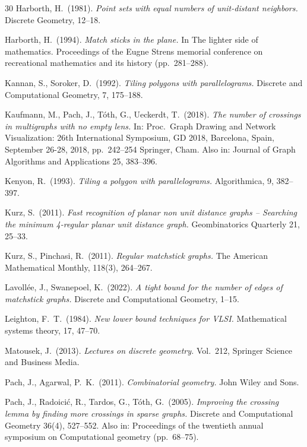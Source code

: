 \documentclass[a4paper,10pt]{article}
\begin{document}
\begin{thebibliography}{30}
Harborth, H.\ (1981).
{\it Point sets with equal numbers of unit-distant neighbors.}
Discrete Geometry, 12--18.

Harborth, H.\ (1994).
{\it Match sticks in the plane.}
In The lighter side of mathematics. Proceedings of the Eugne Strens memorial conference on recreational mathematics and its history (pp.\ 281--288).


Kannan, S., Soroker, D.\ (1992).
\emph{Tiling polygons with parallelograms.}
Discrete and Computational Geometry, 7, 175--188.


Kaufmann, M., Pach, J., T\'oth, G., Ueckerdt, T.\ (2018).
{\it The number of crossings in multigraphs with no empty lens.}
In: Proc.\ Graph Drawing and Network Visualization: 26th International Symposium, GD 2018, Barcelona, Spain, September 26-28, 2018, pp.\ 242--254 Springer, Cham. Also in: Journal of Graph Algorithms and Applications 25, 383--396. 



Kenyon, R.\ (1993).
\emph{Tiling a polygon with parallelograms.}
Algorithmica, 9, 382--397.



Kurz, S.\ (2011).
{\it Fast recognition of planar non unit distance graphs -- Searching the minimum 4-regular planar unit distance graph.}
Geombinatorics Quarterly 21, 25--33.

Kurz, S., Pinchasi, R.\ (2011).
{\it Regular matchstick graphs.}
The American Mathematical Monthly, 118(3), 264--267.

Lavoll\'ee, J., Swanepoel, K.\ (2022).
{\it A tight bound for the number of edges of matchstick graphs.}
Discrete and Computational Geometry, 1--15.

Leighton, F.\ T.\ (1984).
{\it New lower bound techniques for VLSI.}
Mathematical systems theory, 17, 47--70.

Matousek, J.\ (2013).
{\it Lectures on discrete geometry.}
Vol.\ 212, Springer Science and Business Media.

Pach, J.,  Agarwal, P.\ K.\ (2011).
{\it Combinatorial geometry.}
John Wiley and Sons.


Pach, J., Radoici\'c, R., Tardos, G., T\'oth, G.\ (2005).
{\it Improving the crossing lemma by finding more crossings in sparse graphs.}
Discrete and Computational Geometry 36(4), 527--552.
Also in: Proceedings of the twentieth annual symposium on Computational geometry (pp.\ 68--75).




\end{thebibliography}
\end{document}

